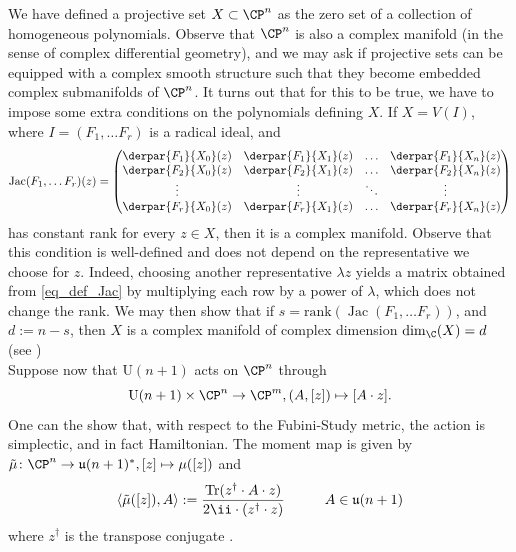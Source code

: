 We have defined a projective set $X \subset \CP^n$ as the zero set of a collection of homogeneous polynomials. Observe that $\CP^n$ is also a complex manifold (in the sense of complex differential geometry), and we may ask if projective sets can be equipped with a complex smooth structure such that they become embedded complex submanifolds of $\CP^n$. It turns out that for this to be true, we have to impose some extra conditions on the polynomials defining $X$. If $X=V(I)$, where $I=(F_1, \ldots F_r)$ is a radical ideal, and 
\begin{equation} \label{eq_def_Jac}
\operatorname{Jac}(F_1, \ldots F_r)(z)=
\begin{pmatrix}
\derpar{F_1}{X_0}(z) & \derpar{F_1}{X_1}(z) & \ldots & \derpar{F_1}{X_n}(z) \\
\derpar{F_2}{X_0}(z) & \derpar{F_2}{X_1}(z) & \ldots & \derpar{F_2}{X_n}(z) \\
\vdots & \vdots & \ddots & \vdots \\
\derpar{F_r}{X_0}(z) & \derpar{F_r}{X_1}(z) & \ldots & \derpar{F_r}{X_n}(z)
\end{pmatrix}
\end{equation}
has constant rank for every $z \in X$, then it is a complex manifold. Observe that this condition is well-defined and does not depend on the representative we choose for $z$. Indeed, choosing another representative \(\lambda z\) yields a matrix obtained from \eqref{eq_def_Jac} by multiplying each row by a power of \(\lambda\), which does not change the rank. We may then show that if $s=\mathrm{rank}(\operatorname{Jac}(F_1, \ldots F_r))$, and $d:=n-s$, then $X$ is a complex manifold of complex dimension $\mathrm{dim}_\C(X)=d$ (see \parencite[Prop. 5.42]{munoz2020geometry}) \\

Suppose now that \(\mathrm{U}(n+1)\) acts on \(\CP^{n}\) through 
\[
\mathrm{U}(n+1) \times \CP^n \to \CP^m, (A, [z]) \mapsto [A\cdot z].
\]
One can the show that, with respect to the Fubini-Study metric, the action is simplectic, and in fact Hamiltonian. The moment map is given by \(\tilde\mu \colon \CP^n \to \mathfrak{u}(n+1)^*, [z] \mapsto \mu([z]) \) and
\begin{equation} \label{eq_mu_tilde}
    \langle \tilde\mu([z]), A\rangle :=\frac{\mathrm{Tr}(z^\dagger \cdot A \cdot z)}{2 \ii \cdot (z^\dagger \cdot z)} \hspace{1 cm} A \in \mathfrak{u}(n+1)
\end{equation}
where \(z^\dagger\) is the transpose conjugate \parencite[Ex. 8.10]{hoskins}.  \\

